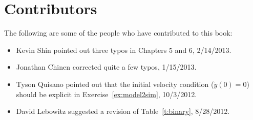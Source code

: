 \chapter{Contributors}
The following are some of the people who have contributed to this book:
\begin{itemize}
\item Kevin Shin pointed out three typos in Chapters 5 and 6, 2/14/2013.
\item Jonathan Chinen corrected quite a few typos, 1/15/2013.
\item Tyson Quisano pointed out that the initial velocity condition ($\dot{y}(0)=0$) should be explicit in Exercise~\ref{ex:model2sim}, 10/3/2012.
\item David Lebowitz suggested a revision of Table~\ref{t:binary}, 8/28/2012.
\end{itemize}

